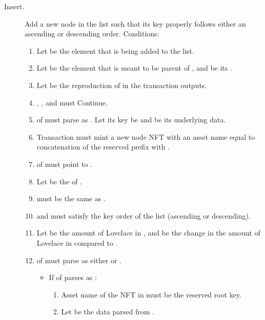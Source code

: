 \documentclass[../midgard.tex]{subfiles}
\begin{document}
\begin{description}
    \item[Insert.] Add a new node in the list such that its key properly follows either an ascending or descending order.
      Conditions:
      \begin{enumerate}
        \item Let  be the element that is being added to the list.
        \item Let  be the element that is meant to be parent of , and  be its .
        \item Let  be the reproduction of  in the transaction outputs.
        \item {}, , and  must Continue.
        \item {} of  must parse as .
          Let its key be  and  be its underlying data.
        \item Transaction must mint a new node NFT with an asset name equal to concatenation of the reserved prefix with .
        \item {} of  must point to .
        \item Let  be the  of .
        \item {} must be the same as .
        \item {} and  must satisfy the key order of the list (ascending or descending).
        \item Let  be the amount of Lovelace in , and  be the change in the amount of Lovelace in  compared to .
        \item {} of  must parse as either  or .
          \begin{itemize}
            \item If  of  parses as :
              \begin{enumerate}[resume]
                \item Asset name of the NFT in  must be the reserved root key.
                \item Let  be the data parsed from .

\end{enumerate}
\end{itemize}
\end{enumerate}
\end{description}
\end{document}
